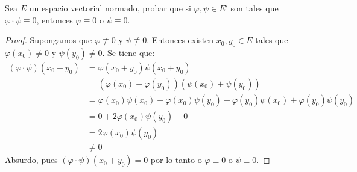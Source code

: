 \documentclass{article}
\theoremstyle{definition}
\newenvironment{ejercicio}[1]{\begin{trivlist}
\item[\hskip \labelsep {\bfseries Ejercicio}\hskip \labelsep {\bfseries #1.}]}{\end{trivlist}}
\begin{document}
\begin{ejercicio}{8}
    Sea \(E\) un espacio vectorial normado, probar que si \(\varphi,\psi\in E'\) son tales que \(\varphi\cdot\psi\equiv 0\), entonces \(\varphi\equiv 0\) o \(\psi\equiv 0\).
\end{ejercicio}
\begin{proof}
    Supongamos que \(\varphi \not\equiv 0\) y \(\psi \not\equiv 0\). Entonces existen \(x_0, y_0 \in E\) tales que \(\varphi(x_0) \neq 0\) y \(\psi(y_0) \neq 0\). Se tiene que:\begin{align*}
        (\varphi \cdot \psi)(x_0+y_0) & = \varphi(x_0+y_0) \psi(x_0+y_0)                                                                \\
                                      & = (\varphi(x_0) + \varphi(y_0)) (\psi(x_0) + \psi(y_0))                                         \\
                                      & = \varphi(x_0)\psi(x_0) + \varphi(x_0)\psi(y_0) + \varphi(y_0)\psi(x_0) + \varphi(y_0)\psi(y_0) \\
                                      & = 0 + 2\varphi(x_0)\psi(y_0) + 0                                                                \\
                                      & = 2\varphi(x_0)\psi(y_0)                                                                        \\
                                      & \neq 0
    \end{align*}
    Absurdo, pues \( (\varphi \cdot \psi)(x_0+y_0) = 0 \) por lo tanto o \( \varphi \equiv 0 \) o \( \psi \equiv 0 \).
\end{proof}

\vspace{0.5cm}
\end{document}
